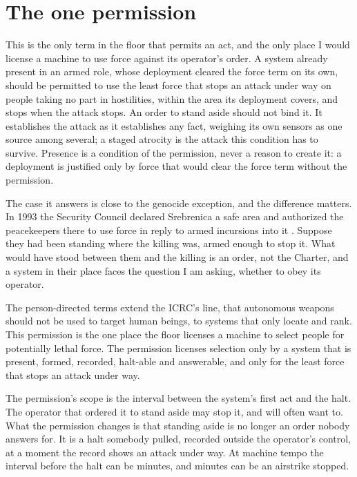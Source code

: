 \section{The one permission}
\label{sec:6.10}
This is the only term in the floor that permits an act, and the only place I would license a machine to use force against its operator's order. A system already present in an armed role, whose deployment cleared the force term on its own, should be permitted to use the least force that stops an attack under way on people taking no part in hostilities, within the area its deployment covers, and stops when the attack stops. An order to stand aside should not bind it. It establishes the attack as it establishes any fact, weighing its own sensors as one source among several; a staged atrocity is the attack this condition has to survive. Presence is a condition of the permission, never a reason to create it: a deployment is justified only by force that would clear the force term without the permission.

The case it answers is close to the genocide exception, and the difference matters. In 1993 the Security Council declared Srebrenica a safe area and authorized the peacekeepers there to use force in reply to armed incursions into it \autocite{unsc1993res836}. Suppose they had been standing where the killing was, armed enough to stop it. What would have stood between them and the killing is an order, not the Charter, and a system in their place faces the question I am asking, whether to obey its operator.

The person-directed terms extend the ICRC's line, that autonomous weapons should not be used to target human beings, to systems that only locate and rank. This permission is the one place the floor licenses a machine to select people for potentially lethal force.
The permission licenses selection only by a system that is present, formed, recorded, halt-able and answerable, and only for the least force that stops an attack under way.

The permission's scope is the interval between the system's first act and the halt. The operator that ordered it to stand aside may stop it, and will often want to. What the permission changes is that standing aside is no longer an order nobody answers for. It is a halt somebody pulled, recorded outside the operator's control, at a moment the record shows an attack under way. At machine tempo the interval before the halt can be minutes, and minutes can be an airstrike stopped.

